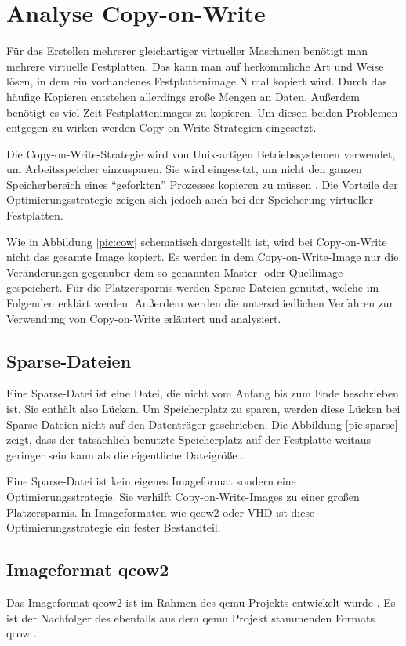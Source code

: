 \chapter{Analyse Copy-on-Write}
Für das Erstellen mehrerer gleichartiger virtueller Maschinen benötigt man mehrere virtuelle Festplatten. Das kann man auf herkömmliche Art und Weise lösen, in dem ein vorhandenes Festplattenimage N mal kopiert wird. Durch das häufige Kopieren entstehen allerdings große Mengen an Daten. Außerdem benötigt es viel Zeit Festplattenimages zu kopieren. Um diesen beiden Problemen entgegen zu wirken werden Copy-on-Write-Strategien eingesetzt.

Die Copy-on-Write-Strategie wird von Unix-artigen Betriebssystemen verwendet, um Arbeitsspeicher einzusparen. Sie wird eingesetzt, um nicht den ganzen Speicherbereich eines ``geforkten'' Prozesses kopieren zu müssen \cite{linuxcow}. Die Vorteile der Optimierungsstrategie zeigen sich jedoch auch bei der Speicherung virtueller Festplatten.

Wie in Abbildung \ref{pic:cow} schematisch dargestellt ist, wird bei Copy-on-Write nicht das gesamte Image kopiert. Es werden in dem Copy-on-Write-Image nur die Veränderungen gegenüber dem so genannten Master- oder Quellimage gespeichert. Für die Platzersparnis werden Sparse-Dateien genutzt, welche im Folgenden erklärt werden. Außerdem werden die unterschiedlichen Verfahren zur Verwendung von Copy-on-Write erläutert und analysiert.
{\fontsize{11.9pt}{14pt}\selectfont
\section{Sparse-Dateien}
Eine Sparse-Datei ist eine Datei, die nicht vom Anfang bis zum Ende beschrieben ist. Sie enthält also Lücken. Um Speicherplatz zu sparen, werden diese Lücken bei Sparse-Dateien nicht auf den Datenträger geschrieben. Die Abbildung \ref{pic:sparse} zeigt, dass der tatsächlich benutzte Speicherplatz auf der Festplatte weitaus geringer sein kann als die eigentliche Dateigröße \cite{Sparse}.


Eine Sparse-Datei ist kein eigenes Imageformat sondern eine Optimierungsstrategie. Sie verhilft Copy-on-Write-Images zu einer großen Platzersparnis. In Imageformaten wie qcow2 oder VHD ist diese Optimierungsstrategie ein fester Bestandteil. 

\section{Imageformat qcow2}
Das Imageformat qcow2 ist im Rahmen des qemu Projekts entwickelt wurde \cite{Qemuwiki}. Es ist der Nachfolger des ebenfalls aus dem qemu Projekt stammenden Formats qcow \cite{qcowmarkmc}. }

